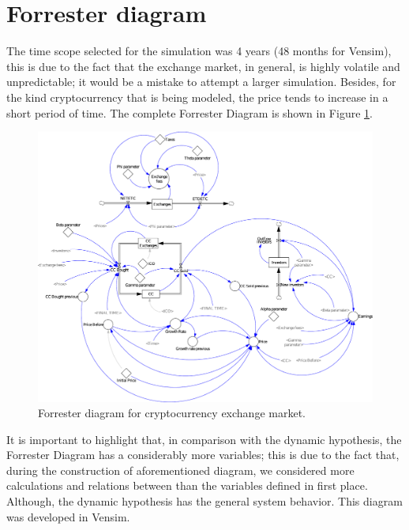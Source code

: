 
\section{Forrester diagram}
The time scope selected for the simulation was 4 years (48 months for Vensim), this is due to the fact that the exchange market, in general, is highly volatile and unpredictable; it would be a mistake to attempt a larger simulation. Besides, for the kind cryptocurrency that is being modeled, the price tends to increase in a short period of time. The complete Forrester Diagram is shown in Figure \ref{img:forrester}.
\begin{figure}[ht]
	\centering
    \includegraphics[scale=0.6]{files/ForresterDiag.pdf}
    \caption{Forrester diagram for cryptocurrency exchange market.}
    \label{img:forrester}
\end{figure}

It is important to highlight that, in comparison with the dynamic hypothesis, the Forrester Diagram has a considerably more variables; this is due to the fact that, during the construction of aforementioned diagram, we considered more calculations and relations between than the variables defined in first place. Although, the dynamic hypothesis has the general system behavior. This diagram was developed in Vensim.
